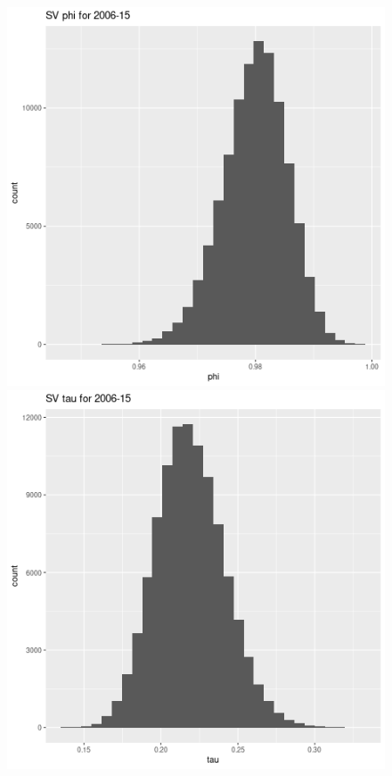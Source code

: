 \documentclass[12pt,letterpaper,reqno,fleqn]{article}
\begin{document}
\begin{figure}
\includegraphics[scale = .4]{svp0615}
\includegraphics[scale = .4]{svt0615}

\end{figure}
\end{document}
